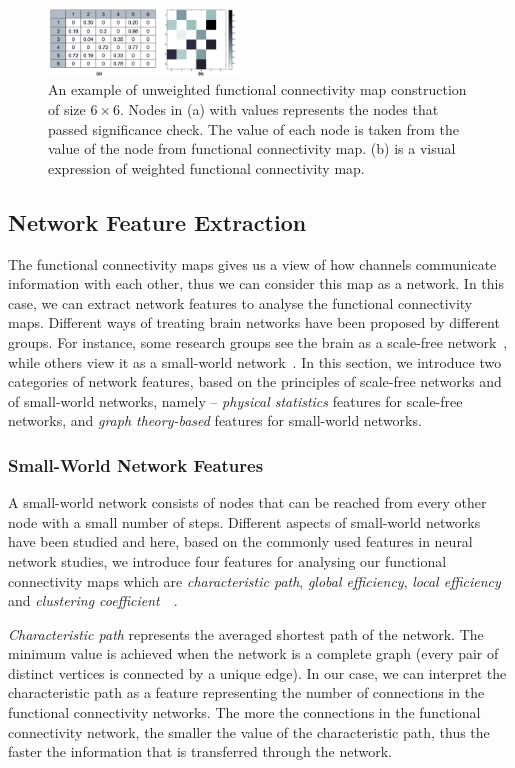 \begin{figure}[!t]
    \centering
    \includegraphics[width=0.45\textwidth]{./images/weightednetwork.png}
    \caption{An example of unweighted functional connectivity map construction of size $6 \times 6$. Nodes in (a) with values represents the nodes that passed significance check. The value of each node is taken from the value of the node from functional connectivity map. (b) is a visual expression of weighted functional connectivity map.}
    \label{fig:weightednetwork}
\end{figure}
\subsection{Network Feature Extraction}
The functional connectivity maps gives us a view of how channels communicate information with each other, thus we can consider this map as a network. In this case, we can extract network features to analyse the functional connectivity maps. Different ways of treating brain networks have been proposed by different groups. For instance, some research groups see the brain as a scale-free network~\cite{eguiluz2005scale}, while others view it as a small-world network~\cite{bassett2006small}. In this section, we introduce two categories of network features, based on the principles of scale-free networks and of small-world networks, namely -- \emph{physical statistics} features for scale-free networks, and \emph{graph theory-based} features for small-world networks.

\subsubsection{Small-World Network Features}
A small-world network consists of nodes that can be reached from every other node with a small number of steps. Different aspects of small-world networks have been studied and here, based on the commonly used features in neural network studies, we introduce four features for analysing our functional connectivity maps which are \emph{characteristic path}, \emph{global efficiency}, \emph{local efficiency} and \emph{clustering coefficient}~\cite{watts1998collective}~\cite{latora2001efficient}.

\emph{Characteristic path} represents the averaged shortest path of the network. The minimum value is achieved when the network is a complete graph (every pair of distinct vertices is connected by a unique edge). In our case, we can interpret the characteristic path as a feature representing the number of connections in the functional connectivity networks. The more the connections in the functional connectivity network, the smaller the value of the characteristic path, thus the faster the information that is transferred through the network. 

